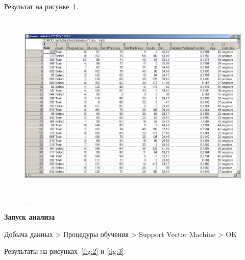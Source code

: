 Результат на рисунке~\ref{fig:v5_1}.

\begin{figure}[!h]
  \centering

  \includegraphics[height=9cm]
  {inc/v5_1.PNG}

  \caption{\_}

  \label{fig:v5_1}
\end{figure}

\newpage

\begin{center}
  \textbf{Запуск анализа}
\end{center}

Добыча данных > Процедуры обучения > Support Vector Machine > OK

Результаты на рисунках~\ref{fig:2} и \ref{fig:3}.

